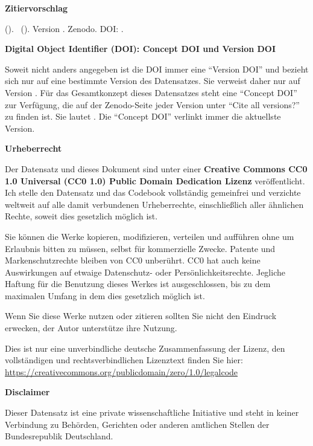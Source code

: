\textbf{Zitiervorschlag}

\emph{\projectauthor} (\the\year ). \datatitle\ (\datashort ). Version \version . Zenodo. DOI: \dataversiondoi .


\vspace{0.5cm}


\textbf{Digital Object Identifier (DOI): Concept DOI und Version DOI}

Soweit nicht anders angegeben ist die DOI immer eine \enquote{Version DOI} und bezieht sich nur auf eine bestimmte Version des Datensatzes. Sie verweist daher nur auf Version \version . Für das Gesamtkonzept dieses Datensatzes steht eine \enquote{Concept DOI} zur Verfügung, die auf der Zenodo-Seite jeder Version unter \enquote{Cite all versions?} zu finden ist. Sie lautet \dataconceptdoi . Die \enquote{Concept DOI} verlinkt immer die aktuellste Version.


\vspace{0.5cm}


\textbf{Urheberrecht}

Der Datensatz und dieses Dokument sind unter einer \textbf{Creative Commons CC0 1.0 Universal (CC0 1.0) Public Domain Dedication Lizenz} veröffentlicht. Ich stelle den Datensatz und das Codebook vollständig gemeinfrei und verzichte weltweit auf alle damit verbundenen Urheberrechte, einschließlich aller ähnlichen Rechte, soweit dies gesetzlich möglich ist. 

Sie können die Werke kopieren, modifizieren, verteilen und aufführen ohne um Erlaubnis bitten zu müssen, selbst für kommerzielle Zwecke. Patente und Markenschutzrechte bleiben von CC0 unberührt. CC0 hat auch keine Auswirkungen auf etwaige Datenschutz- oder Persönlichkeitsrechte. Jegliche Haftung für die Benutzung dieses Werkes ist ausgeschlossen, bis zu dem maximalen Umfang in dem dies gesetzlich möglich ist. 

Wenn Sie diese Werke nutzen oder zitieren sollten Sie nicht den Eindruck erwecken, der Autor unterstütze ihre Nutzung.

Dies ist nur eine unverbindliche deutsche Zusammenfassung der Lizenz, den vollständigen und rechtsverbindlichen Lizenztext finden Sie hier: \url{https://creativecommons.org/publicdomain/zero/1.0/legalcode}

\vspace{0.5cm}

\textbf{Disclaimer} 

Dieser Datensatz ist eine private wissenschaftliche Initiative und steht in keiner Verbindung zu Behörden, Gerichten oder anderen amtlichen Stellen der Bundesrepublik Deutschland.

\newpage
